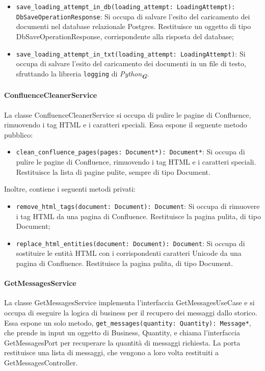\begin{itemize}
    \item \texttt{save\_loading\_attempt\_in\_db(loading\_attempt: LoadingAttempt):\\ DbSaveOperationResponse}: Si occupa di salvare l'esito del caricamento dei documenti nel database relazionale Postgres. Restituisce un oggetto di tipo DbSaveOperationResponse, corrispondente alla risposta del database;
    \item \texttt{save\_loading\_attempt\_in\_txt(loading\_attempt: LoadingAttempt)}: Si occupa di salvare l'esito del caricamento dei documenti in un file di testo, sfruttando la libreria \texttt{logging} di \emph{Python}\textsubscript{\textbf{\textit{G}}}.
\end{itemize}

\paragraph{ConfluenceCleanerService}
\label{sec:confluence_cleaner_service}
La classe ConfluenceCleanerService si occupa di pulire le pagine di Confluence, rimuovendo i tag HTML e i caratteri speciali. Essa espone il seguente metodo pubblico:
\begin{itemize}
    \item \texttt{clean\_confluence\_pages(pages: Document*): Document*}: Si occupa di pulire le pagine di Confluence, rimuovendo i tag HTML e i caratteri speciali. Restituisce la lista di pagine pulite, sempre di tipo Document.
\end{itemize}
Inoltre, contiene i seguenti metodi privati:
\begin{itemize}
    \item \texttt{remove\_html\_tags(document: Document): Document}: Si occupa di rimuovere i tag HTML da una pagina di Confluence. Restituisce la pagina pulita, di tipo Document;
    \item \texttt{replace\_html\_entities(document: Document): Document}: Si occupa di sostituire le entità HTML con i corrispondenti caratteri Unicode da una pagina di Confluence. Restituisce la pagina pulita, di tipo Document.
\end{itemize}

\paragraph{GetMessagesService}
\label{sec:get_messages_service}
La classe GetMessagesService implementa l'interfaccia GetMessagesUseCase e si occupa di eseguire la logica di business per il recupero dei messaggi dallo storico. Essa espone un solo metodo, \texttt{get\_messages(quantity: Quantity): Message*}, che prende in input un oggetto di Business, Quantity, e chiama l'interfaccia GetMessagesPort per recuperare la quantità di messaggi richiesta. La porta restituisce una lista di messaggi, che vengono a loro volta restituiti a GetMessagesController.


